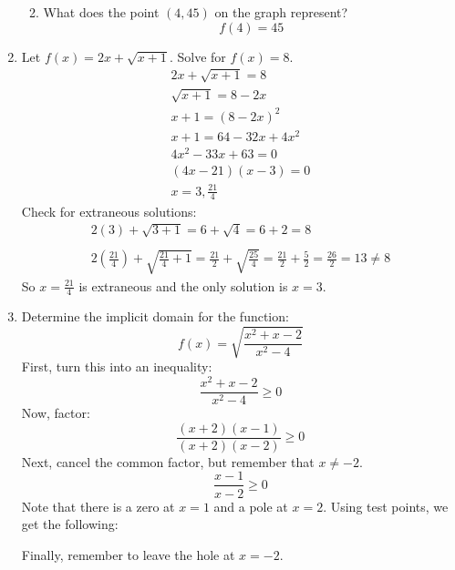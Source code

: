 \documentclass[letterpaper,12pt,fleqn]{article}
\begin{document}
\begin{enumerate}
\begin{enumerate}
    \bigskip

  \item What does the point \((4,45)\) on the graph represent?
    \[f(4)=45\]
  \end{enumerate}

\item Let \(f(x)=2x+\sqrt{x+1}\).  Solve for \(f(x)=8\).
  \begin{gather*}
    2x+\sqrt{x+1}=8 \\
    \sqrt{x+1}=8-2x \\
    x+1=(8-2x)^2 \\
    x+1=64-32x+4x^2 \\
    4x^2-33x+63=0 \\
    (4x-21)(x-3)=0 \\
    x=3,\frac{21}{4}
  \end{gather*}
  Check for extraneous solutions:
  \begin{gather*}
    2(3)+\sqrt{3+1}=6+\sqrt{4}=6+2=8 \\
    \\
    2\left(\frac{21}{4}\right)+\sqrt{\frac{21}{4}+1}=\frac{21}{2}+\sqrt{\frac{25}{4}}=
    \frac{21}{2}+\frac{5}{2}=\frac{26}{2}=13\ne8
  \end{gather*}
  So \(x=\frac{21}{4}\) is extraneous and the only solution is \(x=3\).

\item Determine the implicit domain for the function:
  \[f(x)=\sqrt{\frac{x^2+x-2}{x^2-4}}\]
  First, turn this into an inequality:
  \[\frac{x^2+x-2}{x^2-4}\ge0\]
  Now, factor:
  \[\frac{(x+2)(x-1)}{(x+2)(x-2)}\ge0\]
  Next, cancel the common factor, but remember that \(x\ne-2\).
  \[\frac{x-1}{x-2}\ge0\]
  Note that there is a zero at \(x=1\) and a pole at \(x=2\).  Using test points, we get the following:

  \bigskip

  \begin{center}
  \end{center}

  \bigskip

  Finally, remember to leave the hole at \(x=-2\).


\end{enumerate}
\end{document}
